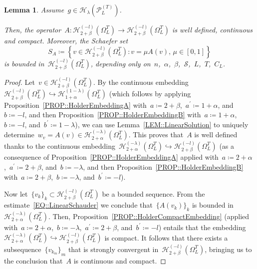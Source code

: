 \documentclass[12pt,a4paper]{amsart}
\numberwithin{equation}{section}
\newtheorem{lemma}[theorem]{Lemma}
\theoremstyle{definition}
\theoremstyle{remark}
\begin{document}
\begin{lemma}\label{LEM::SchaeferAssumptions}
    Assume~$g \in \mathcal{H}_{\lambda}\left(\mathcal{P}_L^{(T)}\right)$.

    Then, the operator~$A \colon \mathcal{H}_{2+\beta}^{(-l)}\left(\Omega_L^T\right) \to \mathcal{H}_{2+\beta}^{(-l)}\left(\Omega_L^T\right)$ is well defined, continuous and compact. Moreover, the Schaefer set
    \begin{equation}
        S_A \coloneq \left\{ v \in \mathcal{H}_{2+\beta}^{(-l)}\left(\Omega_L^T\right) \colon v = \mu A(v),\, \mu\in[0,1]\right\}
    \end{equation}
    is bounded in~$\mathcal{H}_{2+\beta}^{(-l)}\left(\Omega_L^T\right)$, depending only on~$n$,~$\alpha$,~$\beta$,~$\mathcal{S}$,~$L$,~$T$,~$C_L$.
\end{lemma}
\begin{proof}
    Let~$v \in \mathcal{H}_{2+\beta}^{(-l)}\left(\Omega_L^T\right)$. By the continuous embedding~$\mathcal{H}_{2+\beta}^{(-l)}\left(\Omega_L^T\right) \hookrightarrow \mathcal{H}_{1+\alpha}^{(1-\lambda)}\left(\Omega_L^T\right)$ (which follows by applying Proposition~\ref{PROP::HolderEmbeddingA} with~$a \coloneq 2+\beta$,~$a^\prime \coloneq 1+\alpha$, and~$b \coloneq -l$, and then Proposition~\ref{PROP::HolderEmbeddingB} with~$a \coloneq 1+\alpha$,~$b \coloneq -l$, and~$b^\prime \coloneq 1-\lambda$), we can use Lemma~\ref{LEM::LinearSolution} to uniquely determine~$w_v = A(v) \in \mathcal{H}_{2+\alpha}^{(-\lambda)}\left(\Omega_L^T\right)$. This proves that~$A$ is well defined thanks to the continuous embedding~$\mathcal{H}_{2+\alpha}^{(-\lambda)}\left(\Omega_L^T\right) \hookrightarrow \mathcal{H}_{2+\beta}^{(-l)}\left(\Omega_L^T\right)$ (as a consequence of Proposition~\ref{PROP::HolderEmbeddingA} applied with~$a \coloneq 2+\alpha$,~$a^\prime \coloneq 2+\beta$, and~$b \coloneq -\lambda$, and then Proposition~\ref{PROP::HolderEmbeddingB} with~$a \coloneq 2+\beta$,~$b \coloneq -\lambda$, and~$b^\prime \coloneq -l$).

    Now let~${\{v_k\}}_k \subset \mathcal{H}_{2+\beta}^{(-l)}\left(\Omega_L^T\right)$ be a bounded sequence. From the estimate~\eqref{EQ::LinearSchauder} we conclude that~${\{A(v_k)\}}_k$ is bounded in~$\mathcal{H}_{2+\alpha}^{(-\lambda)}\left(\Omega_L^T\right)$. Then, Proposition~\ref{PROP::HolderCompactEmbedding} (applied with~$a \coloneq 2+\alpha$,~$b \coloneq -\lambda$,~$a^\prime \coloneq 2+\beta$, and~$b^\prime \coloneq -l$) entails that the embedding~$\mathcal{H}_{2+\alpha}^{(-\lambda)}\left(\Omega_L^T\right) \hookrightarrow \mathcal{H}_{2+\beta}^{(-l)}\left(\Omega_L^T\right)$ is compact. It follows that there exists a subsequence~${\{v_{k_m}\}}_{m}$ that is strongly convergent in~$\mathcal{H}_{2+\beta}^{(-l)}\left(\Omega_L^T\right)$, bringing us to the conclusion that~$A$ is continuous and compact.


\end{proof}
\end{document}
